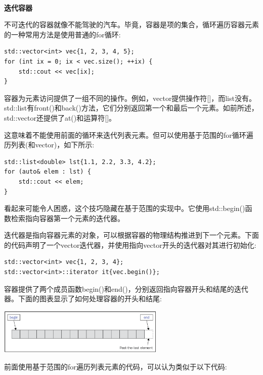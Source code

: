 \noindent\textbf{}\ \par
\textbf{迭代容器} \ \par
不可迭代的容器就像不能驾驶的汽车。毕竟，容器是项的集合，循环遍历容器元素的一种常用方法是使用普通的for循环: \par

\begin{lstlisting}[caption={}]
std::vector<int> vec{1, 2, 3, 4, 5};
for (int ix = 0; ix < vec.size(); ++ix) {
	std::cout << vec[ix];
}
\end{lstlisting}

容器为元素访问提供了一组不同的操作。例如，vector提供操作符[]，而list没有。std::list有front()和back()方法，它们分别返回第一个和最后一个元素。如前所述，std::vector还提供了at()和运算符[]。 \par
这意味着不能使用前面的循环来迭代列表元素。但可以使用基于范围的for循环遍历列表(和vector)，如下所示: \par

\begin{lstlisting}[caption={}]
std::list<double> lst{1.1, 2.2, 3.3, 4.2};
for (auto& elem : lst) {
	std::cout << elem;
}
\end{lstlisting}

看起来可能令人困惑，这个技巧隐藏在基于范围的实现中。它使用std::begin()函数检索指向容器第一个元素的迭代器。 \par 
迭代器是指向容器元素的对象，可以根据容器的物理结构推进到下一个元素。下面的代码声明了一个vector迭代器，并使用指向vector开头的迭代器对其进行初始化: \par

\begin{lstlisting}[caption={}]
std::vector<int> vec{1, 2, 3, 4};
std::vector<int>::iterator it{vec.begin()};
\end{lstlisting}

容器提供了两个成员函数begin()和end()，分别返回指向容器开头和结尾的迭代器。下面的图表显示了如何处理容器的开头和结尾: \par

\begin{center}
	\includegraphics[width=0.6\textwidth]{content/Section-2/Chapter-6/18}
\end{center}

前面使用基于范围的for遍历列表元素的代码，可以认为类似于以下代码: \par


